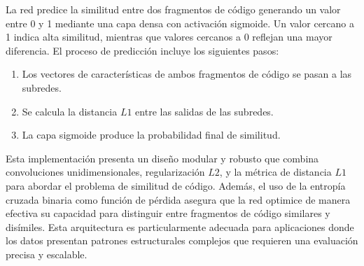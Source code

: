 La red predice la similitud entre dos fragmentos de código generando un valor entre 0 y 1 mediante una capa densa con activación sigmoide. Un valor cercano a 1 indica alta similitud, mientras que valores cercanos a 0 reflejan una mayor diferencia. El proceso de predicción incluye los siguientes pasos:
\begin{enumerate}
    \item Los vectores de características de ambos fragmentos de código se pasan a las subredes.
    \item Se calcula la distancia \( L1 \) entre las salidas de las subredes.
    \item La capa sigmoide produce la probabilidad final de similitud.
\end{enumerate}



Esta implementación presenta un diseño modular y robusto que combina convoluciones unidimensionales, regularización \( L2 \), y la métrica de distancia \( L1 \) para abordar el problema de similitud de código. Además, el uso de la entropía cruzada binaria como función de pérdida asegura que la red optimice de manera efectiva su capacidad para distinguir entre fragmentos de código similares y disímiles. Esta arquitectura es particularmente adecuada para aplicaciones donde los datos presentan patrones estructurales complejos que requieren una evaluación precisa y escalable. 